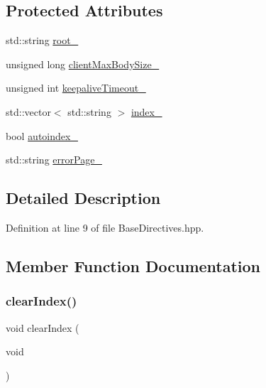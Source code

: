 \subsection*{Protected Attributes}
\begin{DoxyCompactItemize}
\item 
std\+::string \hyperlink{classft_1_1_base_directives_abb1eaf0bba10b90172d6152e69457dc7}{root\+\_\+}
\item 
unsigned long \hyperlink{classft_1_1_base_directives_ad65c2594d2a90ca065d410dfd4066a19}{client\+Max\+Body\+Size\+\_\+}
\item 
unsigned int \hyperlink{classft_1_1_base_directives_aa1f5f394b428d0d18765a9b9e14e648f}{keepalive\+Timeout\+\_\+}
\item 
std\+::vector$<$ std\+::string $>$ \hyperlink{classft_1_1_base_directives_a6ba30626837f300201cd32c35d50aa49}{index\+\_\+}
\item 
bool \hyperlink{classft_1_1_base_directives_a4ebffbe32f50a462afa139c6f03c1a4f}{autoindex\+\_\+}
\item 
std\+::string \hyperlink{classft_1_1_base_directives_a5c0d388109f086503961de84fe3fce90}{error\+Page\+\_\+}
\end{DoxyCompactItemize}


\subsection{Detailed Description}


Definition at line 9 of file Base\+Directives.\+hpp.



\subsection{Member Function Documentation}
\mbox{\label{classft_1_1_base_directives_a36d96dc74e650162c25a325813130ab2}} 
\subsubsection{\texorpdfstring{clear\+Index()}{clearIndex()}}
{\footnotesize\ttfamily void clear\+Index (\begin{DoxyParamCaption}\item[{void}]{ }\end{DoxyParamCaption})}



